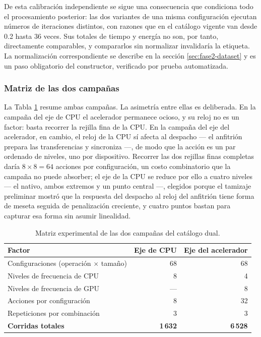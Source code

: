 \documentclass[12pt,oneside,spanish]{book}
\begin{document}
De esta calibración independiente se sigue una consecuencia que condiciona todo el procesamiento posterior: las dos variantes de una misma configuración ejecutan números de iteraciones distintos, con razones que en el catálogo vigente van desde 0.2 hasta 36 veces. Sus totales de tiempo y energía no son, por tanto, directamente comparables, y compararlos sin normalizar invalidaría la etiqueta. La normalización correspondiente se describe en la sección \ref{sec:fase2-dataset} y es un paso obligatorio del constructor, verificado por prueba automatizada.

\subsubsection*{Matriz de las dos campañas}

La Tabla \ref{tab:matriz-dual} resume ambas campañas. La asimetría entre ellas es deliberada. En la campaña del eje de CPU el acelerador permanece ocioso, y su reloj no es un factor: basta recorrer la rejilla fina de la CPU. En la campaña del eje del acelerador, en cambio, el reloj de la CPU sí afecta al despacho --- el anfitrión prepara las transferencias y sincroniza ---, de modo que la acción es un par ordenado de niveles, uno por dispositivo. Recorrer las dos rejillas finas completas daría $8\times8=64$ acciones por configuración, un costo combinatorio que la campaña no puede absorber; el eje de la CPU se reduce por ello a cuatro niveles --- el nativo, ambos extremos y un punto central ---, elegidos porque el tamizaje preliminar mostró que la respuesta del despacho al reloj del anfitrión tiene forma de meseta seguida de penalización creciente, y cuatro puntos bastan para capturar esa forma sin asumir linealidad.

\begin{table}[H]
\centering
\caption[Matriz experimental del catálogo dual]{Matriz experimental de las dos campañas del catálogo dual.}
\label{tab:matriz-dual}
\begin{tabular}{@{}lrr@{}}
\toprule
\textbf{Factor} & \textbf{Eje de CPU} & \textbf{Eje del acelerador} \\
\midrule
Configuraciones (operación $\times$ tamaño) & 68 & 68 \\
Niveles de frecuencia de CPU & 8 & 4 \\
Niveles de frecuencia de GPU & --- & 8 \\
Acciones por configuración & 8 & 32 \\
Repeticiones por combinación & 3 & 3 \\
\midrule
\textbf{Corridas totales} & \textbf{1\,632} & \textbf{6\,528} \\
\bottomrule
\end{tabular}
\end{table}
\end{document}
